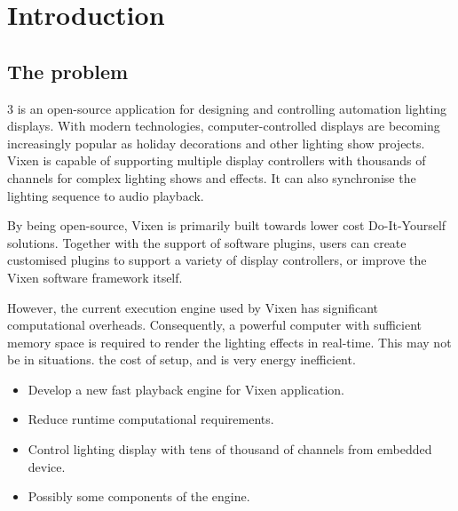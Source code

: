 \chapter{Introduction}
\renewcommand{\baselinestretch}{\mystretch}
\label{chap:Intro}

\section{The problem}

 3 \cite{vixen} is an open-source application for designing and controlling automation lighting displays. With modern technologies, computer-controlled displays are becoming increasingly popular as holiday decorations and other lighting show projects. Vixen is capable of supporting multiple display controllers with thousands of channels for complex lighting shows and effects. It can also synchronise the lighting sequence to audio playback.

By being open-source, Vixen is primarily built towards lower cost Do-It-Yourself solutions. Together with the support of software plugins, users can create customised plugins to support a variety of display controllers, or improve the Vixen software framework itself.

However, the current execution engine used by Vixen has significant computational overheads. Consequently, a powerful computer with sufficient memory space is required to render the lighting effects in real-time. This may not be  in  situations.  the cost of  setup, and is very energy inefficient.

\clearpage



\begin{itemize}[noitemsep]
  \item Develop a new fast playback engine for Vixen application.
  \item Reduce runtime computational requirements.
  \item Control lighting display with tens of thousand of channels from embedded device.
  \item Possibly  some components of the engine.
\end{itemize}

